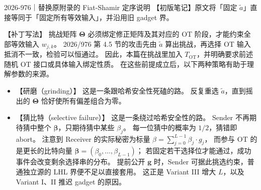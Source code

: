 \begin{patchnote}{2026-976｜替换原附录的 Fiat-Shamir 定序说明}
  【初版笔记】原文将「固定 $\tilde a$」直接等同于「固定所有等效输入」，并沿用旧 gadget 界。

  【补丁写法】
  挑战矩阵 $\boldsymbol{\Theta}$ 必须绑定修正矩阵及其对应的 OT 阶段，才能约束全部等效输入 $w_{j,k}$。
  2026/976 第 4.5 节的攻击先由 $\tilde a$ 算出挑战，再选择 OT 输入抵消不一致，检验可以恒通过。
  因此，本篇在挑战里加入 $T_{\mathrm{OT}}$，并明确要求前述随机 OT 接口或具体输入绑定性质。
  在这些前提成立后，以下两种策略有助于理解参数的来源。

  \begin{itemize}
    \item 【研磨（grinding）】
          这是一条跟哈希安全性死磕的路。
          反复重选 $\tilde a$，直到摇出的 $\boldsymbol{\Theta}$ 恰好使所有偏差组合为零。
    \item 【猜比特（selective failure）】
          这是一条绕过哈希安全性的路。
          Sender 不再期待猜中整个 $\boldsymbol\beta$，只期待猜中某些 $\beta_j$。
          每一位猜中的概率为 $1/2$，猜错即 abort。
          注意到 Receiver 的实际秘密为标量 $\beta=\sum_{j=0}^{L-1} \beta_j \cdot g_j$，
          而参与 OT 的是更长的比特向量 $\boldsymbol\beta=(\beta_0,\ldots,\beta_{L-1})$；
          若固定若干选择位才能通过，成功事件会改变剩余选择串的分布。
          提前公开 $\boldsymbol g$ 时，Sender 可据此挑选约束，普通独立源的 LHL 界便不足以直接套用。
          这正是 Variant III 增大 $L$，以及 Variant I、II 推迟 gadget 的原因。
  \end{itemize}
\end{patchnote}

